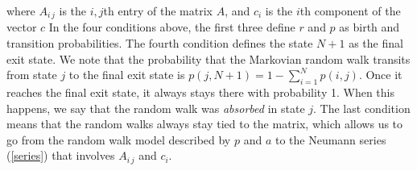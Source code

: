 \documentclass[a4paper,11pt]{article}
\theoremstyle{remark}
\theoremstyle{definition}
\begin{document}
        where $A_{i\,j}$ is the $i,j$th entry of the matrix $A$, and $c_i$
        is the $i$th component of the vector $c$ In the four conditions above,
        the first three define $r$ and $p$ as birth and transition
        probabilities.  The fourth condition defines the state $N+1$ as
        the final exit state.  We note that the probability that the
        Markovian random walk transits from state $j$ to the final exit
        state is $p(j,N+1) = 1 - \sum_{i=1}^N p(i,j)$.  Once it reaches
        the final exit state, it always stays there with probability 1.
        When this happens, we say that the random walk was \emph{absorbed}
        in state $j$.  The last condition means that the random walks always
        stay tied to the matrix, which allows us to go from the random walk
        model described by $p$ and $a$ to the Neumann series (\ref{series})
        that involves $A_{i\,j}$ and $c_i$.
        
\end{document}
